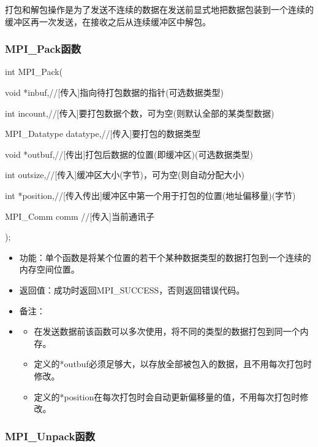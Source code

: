 \documentclass[UTF8]{article}%
\begin{document}
打包和解包操作是为了发送不连续的数据在发送前显式地把数据包装到一个连续的缓冲区再一次发送，在接收之后从连续缓冲区中解包。

\subsubsection{MPI\_Pack函数}

int MPI\_Pack(

    \qquad void            *inbuf,//[传入]指向待打包数据的指针(可选数据类型) 

    \qquad int             incount,//[传入]要打包数据个数，可为空(则默认全部的某类型数据)

    \qquad MPI\_Datatype   datatype,//[传入]要打包的数据类型

    \qquad void            *outbuf,//[传出]打包后数据的位置(即缓冲区)(可选数据类型)

    \qquad int             outsize,//[传入]缓冲区大小(字节)，可为空(则自动分配大小)

    \qquad int             *position,//[传入传出]缓冲区中第一个用于打包的位置(地址偏移量)(字节)

    \qquad MPI\_Comm       comm //[传入]当前通讯子
    
);

\begin{itemize}
    \item 功能：单个函数是将某个位置的若干个某种数据类型的数据打包到一个连续的内存空间位置。
    \item 返回值：成功时返回MPI\_SUCCESS，否则返回错误代码。
    \item 备注：
    \item 
    {
        \begin{itemize}
            \item 在发送数据前该函数可以多次使用，将不同的类型的数据打包到同一个内存。
            \item 定义的*outbuf必须足够大，以存放全部被包入的数据，且不用每次打包时修改。
            \item 定义的*position在每次打包时会自动更新偏移量的值，不用每次打包时修改。
        \end{itemize}
    }

\end{itemize}


\subsubsection{MPI\_Unpack函数}
\end{document}
